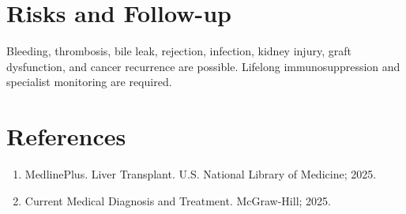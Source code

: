 \section*{Risks and Follow-up}
Bleeding, thrombosis, bile leak, rejection, infection, kidney injury, graft dysfunction, and cancer recurrence are possible. Lifelong immunosuppression and specialist monitoring are required.
\section*{References}
\begin{enumerate}\item MedlinePlus. Liver Transplant. U.S. National Library of Medicine; 2025.\item Current Medical Diagnosis and Treatment. McGraw-Hill; 2025.\end{enumerate}
\clearpage
